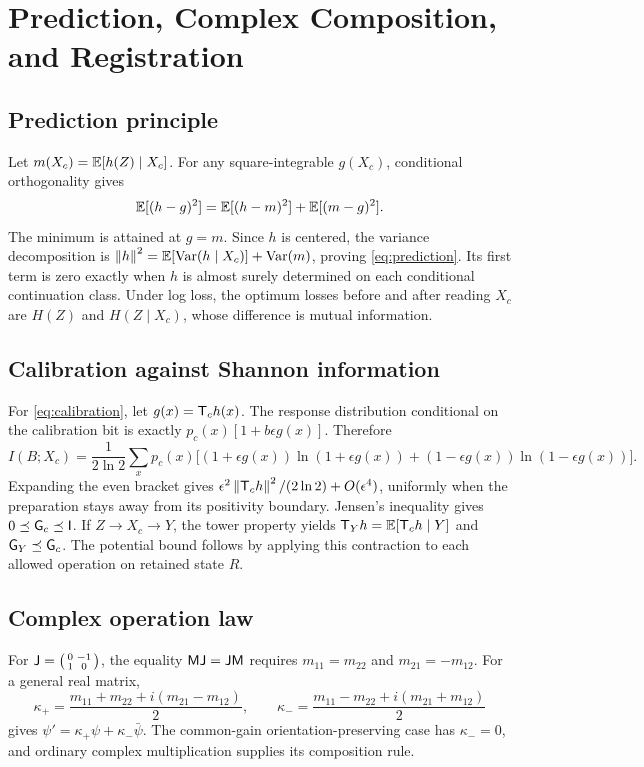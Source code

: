 \section{Prediction, Complex Composition, and Registration}
\label{app:proofs}
\subsection{Prediction principle}
Let \(m(X_c)=\mathbb E[h(Z)\mid X_c]\). For any square-integrable \(g(X_c)\), conditional orthogonality gives
\begin{equation*}
\mathbb E[(h-g)^2]=\mathbb E[(h-m)^2]+\mathbb E[(m-g)^2].
\end{equation*}
The minimum is attained at \(g=m\). Since \(h\) is centered, the variance decomposition is \(\left\lVert h\right\rVert^2=\mathbb E[\operatorname{Var}(h\mid X_c)]+\operatorname{Var}(m)\), proving \cref{eq:prediction}. Its first term is zero exactly when \(h\) is almost surely determined on each conditional continuation class. Under log loss, the optimum losses before and after reading \(X_c\) are \(H(Z)\) and \(H(Z\mid X_c)\), whose difference is mutual information.

\subsection{Calibration against Shannon information}
For \cref{eq:calibration}, let \(g(x)=\mathsf T_ch(x)\). The response distribution conditional on the calibration bit is exactly \(p_c(x)[1+b\epsilon g(x)]\). Therefore
\begin{equation*}
I(B;X_c)=\frac1{2\ln2}\sum_xp_c(x)
\big[(1+\epsilon g(x))\ln(1+\epsilon g(x))+(1-\epsilon g(x))\ln(1-\epsilon g(x))\big].
\end{equation*}
Expanding the even bracket gives \(\epsilon^2\left\lVert\mathsf T_ch\right\rVert^2/(2\ln2)+O(\epsilon^4)\), uniformly when the preparation stays away from its positivity boundary. Jensen's inequality gives \(0\preceq\mathsf G_c\preceq\mathsf I\). If \(Z\to X_c\to Y\), the tower property yields \(\mathsf T_Yh=\mathbb E[\mathsf T_ch\mid Y]\) and \(\mathsf G_Y\preceq\mathsf G_c\). The potential bound follows by applying this contraction to each allowed operation on retained state \(R\).

\subsection{Complex operation law}
For \(\mathsf J=\left(\begin{smallmatrix}0&-1\\1&0\end{smallmatrix}\right)\), the equality \(\mathsf M\mathsf J=\mathsf J\mathsf M\) requires \(m_{11}=m_{22}\) and \(m_{21}=-m_{12}\). For a general real matrix,
\begin{equation*}
\kappa_+=\frac{m_{11}+m_{22}+i(m_{21}-m_{12})}{2},\qquad
\kappa_-=\frac{m_{11}-m_{22}+i(m_{21}+m_{12})}{2}
\end{equation*}
gives \(\psi'=\kappa_+\psi+\kappa_-\bar\psi\). The common-gain orientation-preserving case has \(\kappa_-=0\), and ordinary complex multiplication supplies its composition rule.

